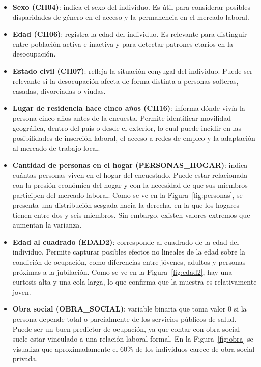 \documentclass[11pt,a4paper]{article}
\begin{document}
\begin{itemize}
  \item \textbf{Sexo (CH04)}: indica el sexo del individuo. Es útil para considerar posibles
        disparidades de género en el acceso y la permanencia en el mercado laboral.

  \item \textbf{Edad (CH06)}: registra la edad del individuo. Es relevante para distinguir
        entre población activa e inactiva y para detectar patrones etarios en la desocupación.

  \item \textbf{Estado civil (CH07)}: refleja la situación conyugal del individuo. Puede ser
        relevante si la desocupación afecta de forma distinta a personas solteras, casadas,
        divorciadas o viudas.

  \item \textbf{Lugar de residencia hace cinco años (CH16)}: informa dónde vivía la persona
        cinco años antes de la encuesta. Permite identificar movilidad geográfica, dentro del
        país o desde el exterior, lo cual puede incidir en las posibilidades de inserción
        laboral, el acceso a redes de empleo y la adaptación al mercado de trabajo local.

  \item \textbf{Cantidad de personas en el hogar (PERSONAS\_HOGAR)}: indica cuántas personas
        viven en el hogar del encuestado. Puede estar relacionada con la presión económica del
        hogar y con la necesidad de que sus miembros participen del mercado laboral. Como se
        ve en la Figura~\ref{fig:personas}, se presenta una distribución sesgada hacia la
        derecha, en la que los hogares tienen entre dos y seis miembros. Sin embargo, existen
        valores extremos que aumentan la varianza.

  \item \textbf{Edad al cuadrado (EDAD2)}: corresponde al cuadrado de la edad del individuo.
        Permite capturar posibles efectos no lineales de la edad sobre la condición de
        ocupación, como diferencias entre jóvenes, adultos y personas próximas a la
        jubilación. Como se ve en la Figura~\ref{fig:edad2}, hay una curtosis alta y una cola
        larga, lo que confirma que la muestra es relativamente joven.

  \item \textbf{Obra social (OBRA\_SOCIAL)}: variable binaria que toma valor 0 si la persona
        depende total o parcialmente de los servicios públicos de salud. Puede ser un buen
        predictor de ocupación, ya que contar con obra social suele estar vinculado a una
        relación laboral formal. En la Figura~\ref{fig:obra} se visualiza que aproximadamente
        el 60\% de los individuos carece de obra social privada.


\end{itemize}
\end{document}
